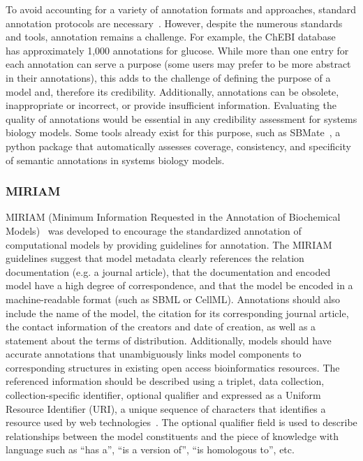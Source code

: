 \documentclass[12pt]{report}
\begin{document}
To avoid accounting for a variety of annotation formats and approaches, standard annotation protocols are necessary~\cite{Gennari2021}. However, despite the numerous standards and tools, annotation remains a challenge. For example, the ChEBI database~\cite{Hastings2015} has approximately 1,000 annotations for glucose. While more than one entry for each annotation can serve a purpose (some users may prefer to be more abstract in their annotations), this adds to the challenge of defining the purpose of a model and, therefore its credibility.  Additionally, annotations can be obsolete, inappropriate or incorrect, or provide insufficient information. Evaluating the quality of annotations would be essential in any credibility assessment for systems biology models. Some tools already exist for this purpose, such as SBMate~\cite{Shin2021}, a python package that automatically assesses coverage, consistency, and specificity of semantic annotations in systems biology models.

\subsubsection{MIRIAM}
 MIRIAM (Minimum Information Requested in the Annotation of Biochemical Models)~\cite{novere_minimum_2005} was developed to encourage the standardized annotation of computational models by providing guidelines for annotation. The MIRIAM guidelines suggest that model metadata clearly references the relation documentation (e.g. a journal article), that the documentation and encoded model have a high degree of correspondence, and that the model be encoded in a machine-readable format (such as SBML or CellML). Annotations should also include the name of the model, the citation for its corresponding journal article, the contact information of the creators and date of creation, as well as a statement about the terms of distribution. Additionally, models should have accurate annotations that unambiguously links model components to corresponding structures in existing open access bioinformatics resources. The referenced information should be described using a triplet, {data collection, collection-specific identifier, optional qualifier} and expressed as a Uniform Resource Identifier (URI), a unique sequence of characters that identifies a resource used by web technologies~\cite{berners2005uniform}. The optional qualifier field is used to describe relationships between the model constituents and the piece of knowledge with language such as ``has a'', ``is a version of'', ``is homologous to'', etc. 
 
\end{document}
